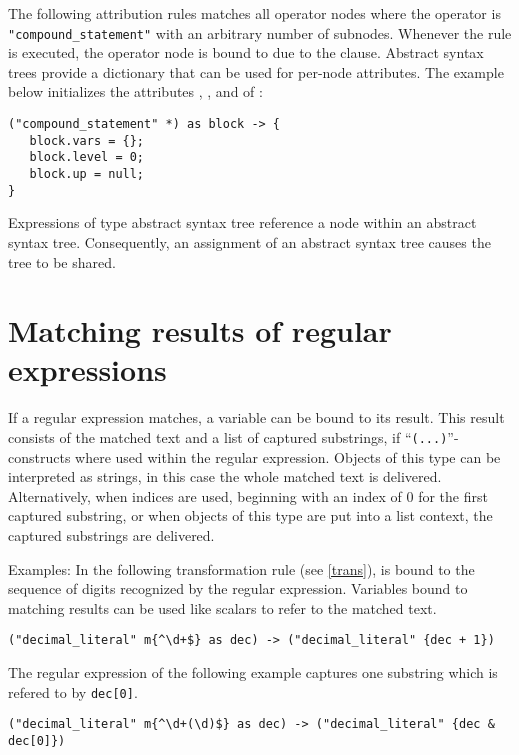 \noindent
The following attribution rules matches all operator nodes where
the operator is \lstinline!"compound_statement"! with an arbitrary
number of subnodes. Whenever the rule is executed, the operator
node is bound to  due to the  clause.
Abstract syntax trees provide a dictionary that can be used for
per-node attributes. The example below initializes the attributes
, , and  of :

\begin{lstlisting}
("compound_statement" *) as block -> {
   block.vars = {};
   block.level = 0;
   block.up = null;
}
\end{lstlisting}

\noindent
Expressions of type abstract syntax tree reference a node within an
abstract syntax tree. Consequently, an assignment of an abstract syntax
tree causes the tree to be shared.

\section{Matching results of regular expressions}\label{matchresult}

If a regular expression matches, a variable can be bound to its
result. This result consists of the matched text and a list
of captured substrings, if ``\lstinline!(...)!''-constructs
where used within the regular expression. Objects of this
type can be interpreted as strings, in this case the whole
matched text is delivered. Alternatively, when indices are
used, beginning with an index of 0 for the first captured substring,
or when objects of this type are put into a list context,
the captured substrings are delivered.

Examples: In the following transformation rule
(see \ref{trans}),
 is bound to the sequence of digits recognized by the
regular expression. Variables bound to matching results can be
used like scalars to refer to the matched text.

\begin{lstlisting}
("decimal_literal" m{^\d+$} as dec) -> ("decimal_literal" {dec + 1})
\end{lstlisting}%

\noindent
The regular expression of the following example 
captures one substring which is refered to by \lstinline!dec[0]!.

\begin{lstlisting}
("decimal_literal" m{^\d+(\d)$} as dec) -> ("decimal_literal" {dec & dec[0]})
\end{lstlisting}%

